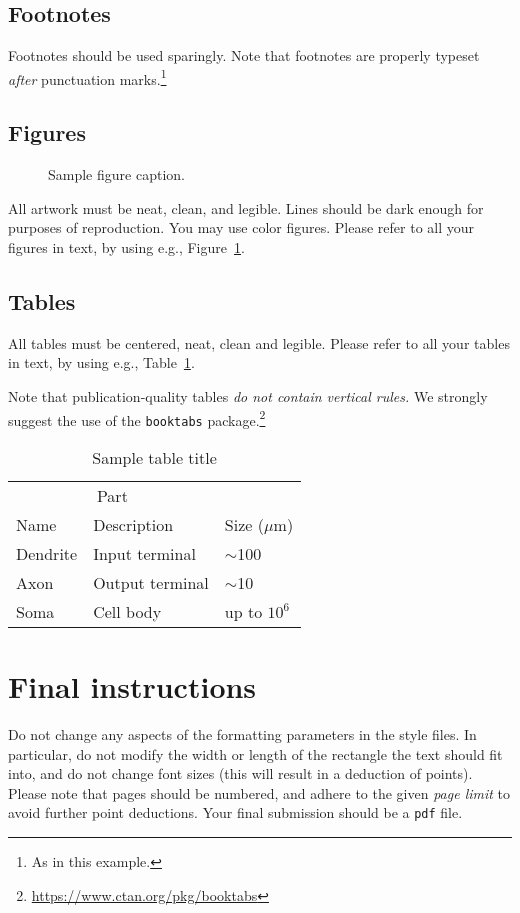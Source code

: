 \documentclass{article}
\begin{document}
\subsection{Footnotes}
Footnotes should be used sparingly. Note that footnotes are properly typeset \emph{after} punctuation marks.\footnote{As in this example.}


\subsection{Figures}


\begin{figure}
  \centering
  \fbox{\rule[-.5cm]{0cm}{4cm} \rule[-.5cm]{4cm}{0cm}}
  \caption{Sample figure caption.}
  \label{fig:example}
\end{figure}


All artwork must be neat, clean, and legible. Lines should be dark enough for
purposes of reproduction. You may use color figures. Please refer to all your figures in text, by using e.g., Figure~\ref{fig:example}. 

\subsection{Tables}
All tables must be centered, neat, clean and legible. Please refer to all your tables in text, by using e.g., Table~\ref{tab:example}.

Note that publication-quality tables \emph{do not contain vertical rules.} We
strongly suggest the use of the \verb+booktabs+ package.\footnote{\url{https://www.ctan.org/pkg/booktabs}}


\begin{table}
  \caption{Sample table title}
  \label{tab:example}
  \centering
  \begin{tabular}{lll}
    \toprule
    \multicolumn{2}{c}{Part}                   \\
    \cmidrule(r){1-2}
    Name     & Description     & Size ($\mu$m) \\
    \midrule
    Dendrite & Input terminal  & $\sim$100     \\
    Axon     & Output terminal & $\sim$10      \\
    Soma     & Cell body       & up to $10^6$  \\
    \bottomrule
  \end{tabular}
\end{table}


\section{Final instructions}

Do not change any aspects of the formatting parameters in the style files. In
particular, do not modify the width or length of the rectangle the text should
fit into, and do not change font sizes (this will result in a deduction of points). 
Please note that pages should be numbered, and adhere to the given \emph{page limit} to avoid further point deductions. Your final submission should be a \texttt{pdf} file.

\end{document}
